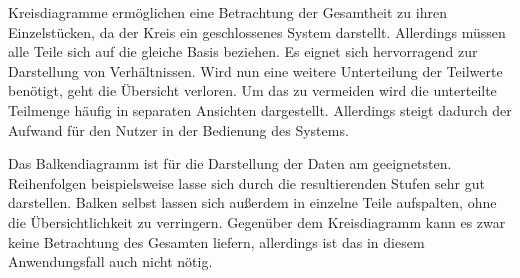 Kreisdiagramme ermöglichen eine Betrachtung der Gesamtheit zu ihren Einzelstücken, da der Kreis ein geschlossenes System darstellt. Allerdings müssen alle Teile sich auf die gleiche Basis beziehen. Es eignet sich hervorragend zur Darstellung von Verhältnissen. Wird nun eine weitere Unterteilung der Teilwerte benötigt, geht die Übersicht verloren. Um das zu vermeiden wird die unterteilte Teilmenge häufig in separaten Ansichten dargestellt. Allerdings steigt dadurch der Aufwand für den Nutzer in der Bedienung des Systems. 

Das Balkendiagramm ist für die Darstellung der Daten am geeignetsten. Reihenfolgen beispielsweise lasse sich durch die resultierenden Stufen sehr gut darstellen. Balken selbst lassen sich außerdem in einzelne Teile aufspalten, ohne die Übersichtlichkeit zu verringern. Gegenüber dem Kreisdiagramm kann es zwar keine Betrachtung des Gesamten liefern, allerdings ist das in diesem Anwendungsfall auch nicht nötig. 


